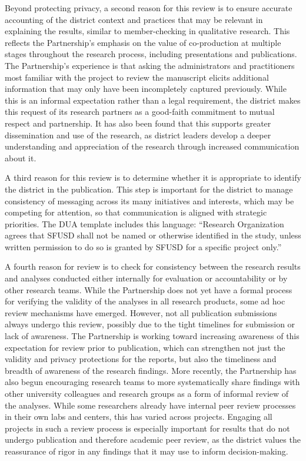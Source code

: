 \documentclass[
]{book}
\begin{document}
Beyond protecting privacy, a second reason for this review is to ensure accurate accounting of the district context and practices that may be relevant in explaining the results, similar to member-checking in qualitative research. This reflects the Partnership's emphasis on the value of co-production at multiple stages throughout the research process, including presentations and publications. The Partnership's experience is that asking the administrators and practitioners most familiar with the project to review the manuscript elicits additional information that may only have been incompletely captured previously. While this is an informal expectation rather than a legal requirement, the district makes this request of its research partners as a good-faith commitment to mutual respect and partnership. It has also been found that this supports greater dissemination and use of the research, as district leaders develop a deeper understanding and appreciation of the research through increased communication about it.

A third reason for this review is to determine whether it is appropriate to identify the district in the publication. This step is important for the district to manage consistency of messaging across its many initiatives and interests, which may be competing for attention, so that communication is aligned with strategic priorities. The DUA template includes this language: ``Research Organization agrees that SFUSD shall not be named or otherwise identified in the study, unless written permission to do so is granted by SFUSD for a specific project only.''

A fourth reason for review is to check for consistency between the research results and analyses conducted either internally for evaluation or accountability or by other research teams. While the Partnership does not yet have a formal process for verifying the validity of the analyses in all research products, some ad hoc review mechanisms have emerged. However, not all publication submissions always undergo this review, possibly due to the tight timelines for submission or lack of awareness. The Partnership is working toward increasing awareness of this expectation for review prior to publication, which can strengthen not just the validity and privacy protections for the reports, but also the timeliness and breadth of awareness of the research findings. More recently, the Partnership has also begun encouraging research teams to more systematically share findings with other university colleagues and research groups as a form of informal review of the analyses. While some researchers already have internal peer review processes in their own labs and centers, this has varied across projects. Engaging all projects in such a review process is especially important for results that do not undergo publication and therefore academic peer review, as the district values the reassurance of rigor in any findings that it may use to inform decision-making.
\end{document}
